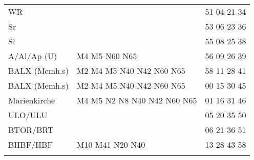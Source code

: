 \begin{tabular}{!{\color{schiefergrau}\vrule width 3pt}*{3}{l!{\color{schiefergrau}\vrule width 3pt}}}
WR           &                                                               & 51 04 21 34 \\
Sr           &                                                               & 53 06 23 36 \\
Si           &                                                               & 55 08 25 38 \\
A/Al/Ap (U)  & \mtram{} M4 M5 \nbus{} N60 N65                                & 56 09 26 39 \\
BALX (Memh.s)& \nuzwei{} \nuacht{} \mtram{} M2 M4 M5 \nbus{} N40 N42 N60 N65 & 58 11 28 41 \\
\hline
BALX (Memh.s)& \nuzwei{} \nuacht{} \mtram{} M2 M4 M5 \nbus{} N40 N42 N60 N65 & 00 15 30 45 \\
Marienkirche & \mtram{} M4 M5 \nbus{} N2 N8 N40 N42 N60 N65                  & 01 16 31 46 \\
ULO/ULU      & \nusechs{}                                                    & 05 20 35 50 \\
BTOR/BRT     &                                                               & 06 21 36 51 \\
BHBF/HBF     & \mtram{} M10 \mbus{} M41 \nbus{} N20 N40                      & 13 28 43 58 \\
\myhline
\end{tabular}
%
